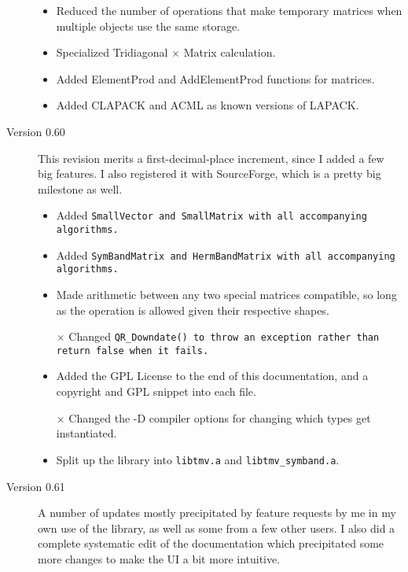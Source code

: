 \begin{description}
\begin{itemize}
\item
Reduced the number of operations that make temporary matrices when multiple
objects use the same storage. 

\item
Specialized Tridiagonal $\times$ Matrix calculation.

\item
Added ElementProd and AddElementProd functions for matrices.

\item
Added CLAPACK and ACML as known versions of LAPACK.  

\end{itemize}

\item[Version 0.60]
This revision merits a first-decimal-place increment, since I added a 
few big features.  I also registered it with SourceForge, 
which is a pretty big milestone as well.

\begin{itemize}

\item
Added \tt{SmallVector} and \tt{SmallMatrix} with all accompanying algorithms.

\item 
Added \tt{SymBandMatrix} and \tt{HermBandMatrix} with all accompanying algorithms.

\item
Made arithmetic between any two special matrices compatible, so long as 
the operation is allowed given their respective shapes.  

\item[$\times$]
Changed \tt{QR\_Downdate()} to throw an exception rather than return false
when it fails.

\item
Added the GPL License to the end of this documentation, and a copyright
and GPL snippet into each file.

\item[$\times$]
Changed the -D compiler options for changing which types get instantiated.

\item
Split up the library into \texttt{libtmv.a} and \texttt{libtmv\_symband.a}. 

\end{itemize}

\item[Version 0.61]
A number of updates mostly precipitated by feature requests by me in my own
use of the library, as well as some from a few other users.
I also did a complete systematic edit of the documentation which 
precipitated some more changes to make the UI a bit more intuitive.


\end{description}
